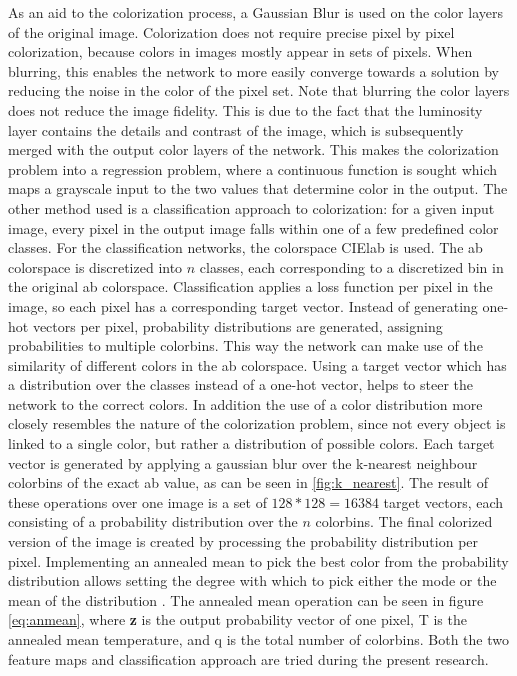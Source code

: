 As an aid to the colorization process, a Gaussian Blur is used on the color layers of the original image. Colorization does not require precise pixel by pixel colorization, because colors in images mostly appear in sets of pixels. When blurring, this enables the network to more easily converge towards a solution by reducing the noise in the color of the pixel set. Note that blurring the color layers does not reduce the image fidelity. This is due to the fact that the luminosity layer contains the details and contrast of the image, which is subsequently merged with the output color layers of the network. This makes the colorization problem into a regression problem, where a continuous function is sought which maps a grayscale input to the two values that determine color in the output.
The other method used is a classification approach to colorization: for a given input image, every pixel in the output image falls within one of a few predefined color classes. For the classification networks, the colorspace CIElab is used. The ab colorspace is discretized into $n$ classes, each corresponding to a discretized bin in the original ab colorspace. Classification applies a loss function per pixel in the image, so each pixel has a corresponding target vector. Instead of generating one-hot vectors per pixel, probability distributions are generated, assigning probabilities to multiple colorbins. This way the network can make use of the similarity of different colors in the ab colorspace. Using a target vector which has a distribution over the classes instead of a one-hot vector, helps to steer the network to the correct colors. In addition the use of a color distribution more closely resembles the nature of the colorization problem, since not every object is linked to a single color, but rather a distribution of possible colors. 
Each target vector is generated by applying a gaussian blur over the k-nearest neighbour colorbins of the exact ab value, as can be seen in \ref{fig:k_nearest}. The result of these operations over one image is a set of $128*128=16384$ target vectors, each consisting of a probability distribution over the $n$ colorbins. 
The final colorized version of the image is created by processing the probability distribution per pixel. Implementing an annealed mean to pick the best color from the probability distribution allows setting the degree with which to pick either the mode or the mean of the distribution \cite{Zhang}. The annealed mean operation can be seen in figure \ref{eq:anmean}, where \textbf{z} is the output probability vector of one pixel, T is the annealed mean temperature, and q is the total number of colorbins. Both the two feature maps and classification approach are tried during the present research.\\

